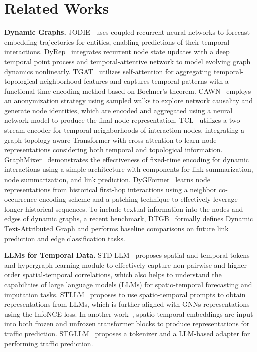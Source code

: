 \section{Related Works}
\textbf{Dynamic Graphs.} JODIE~\cite{kumar2019predicting} uses coupled recurrent neural networks to forecast embedding trajectories for entities, enabling predictions of their temporal interactions. DyRep~\cite{trivedi2019dyrep} integrates recurrent node state updates with a deep temporal point process and temporal-attentive network to model evolving graph dynamics nonlinearly. TGAT~\cite{xu2020inductive} utilizes self-attention for aggregating temporal-topological neighborhood features and captures temporal patterns with a functional time encoding method based on Bochner's theorem. CAWN~\cite{wang2021inductive} employs an anonymization strategy using sampled walks to explore network causality and generate node identities, which are encoded and aggregated using a neural network model to produce the final node representation. TCL~\cite{wang2021tcl} utilizes a two-stream encoder for temporal neighborhoods of interaction nodes, integrating a graph-topology-aware Transformer with cross-attention to learn node representations considering both temporal and topological information. GraphMixer~\cite{cong2023we} demonstrates the effectiveness of fixed-time encoding for dynamic interactions using a simple architecture with components for link summarization, node summarization, and link prediction. DyGFormer~\cite{yu2023towards} learns node representations from historical first-hop interactions using a neighbor co-occurrence encoding scheme and a patching technique to effectively leverage longer historical sequences. To include textual information into the nodes and edges of dynamic graphs, a recent benchmark, DTGB~\cite{zhang2024dtgb} formally defines Dynamic Text-Attributed Graph and performs baseline comparisons on future link prediction and edge classification tasks.

\textbf{LLMs for Temporal Data.} STD-LLM~\cite{huang2024std} proposes spatial and temporal tokens and hypergraph learning module to effectively capture non-pairwise and higher-order spatial-temporal correlations, which also helps to understand the capabilities of large language models (LLMs) for spatio-temporal forecasting and imputation tasks.  STLLM~\cite{zhang2023spatio} proposes to use spatio-temporal prompts to obtain representations from LLMs, which is further aligned with GNNs representations using the InfoNCE loss. In another work~\cite{liu2024spatial}, spatio-temporal embeddings are input into both frozen and unfrozen transformer blocks to produce representations for traffic prediction. STGLLM~\cite{liu2024can} proposes a tokenizer and a LLM-based adapter for performing traffic prediction.



